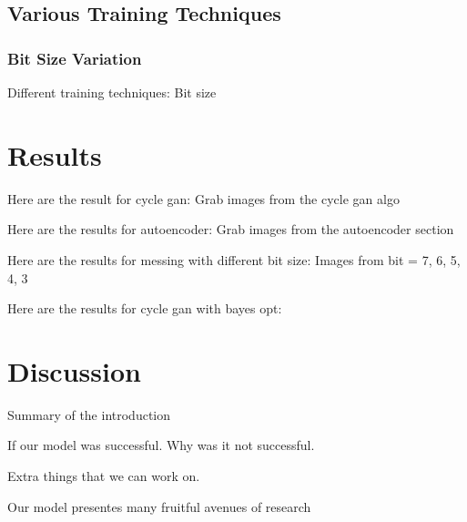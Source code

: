 \documentclass[conference]{IEEEtran}
\begin{document}
\subsection{Various Training Techniques}

\subsubsection{Bit Size Variation}
Different training techniques:
    Bit size

\section{Results}

Here are the result for cycle gan: 
     Grab images from the cycle gan algo

Here are the results for autoencoder:
     Grab images from the autoencoder section 
     
Here are the results for messing with different bit size:
     Images from bit = 7, 6, 5, 4, 3

Here are the results for cycle gan with bayes opt:

\section{Discussion}

Summary of the introduction 

If our model was successful. Why was it not successful. 

Extra things that we can work on. 

Our model presentes many fruitful avenues of research 


\end{document}
